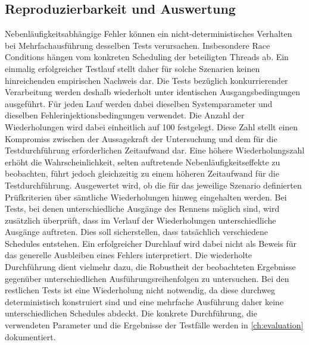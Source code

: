 \subsection{Reproduzierbarkeit und Auswertung}
\label{subsec:reproduzierbarkeit}
Nebenläufigkeitsabhängige Fehler können ein nicht-deterministisches Verhalten bei Mehrfachausführung desselben Tests verursachen.
Insbesondere Race Conditions hängen vom konkreten Scheduling der beteiligten Threads ab.
Ein einmalig erfolgreicher Testlauf stellt daher für solche Szenarien keinen hinreichenden empirischen Nachweis dar.
Die Tests bezüglich konkurrierender Verarbeitung werden deshalb wiederholt unter identischen Ausgangsbedingungen ausgeführt.
Für jeden Lauf werden dabei dieselben Systemparameter und dieselben Fehlerinjektionsbedingungen verwendet.
Die Anzahl der Wiederholungen wird dabei einheitlich auf 100 festgelegt.
Diese Zahl stellt einen Kompromiss zwischen der Aussagekraft der Untersuchung und dem für die Testdurchführung erforderlichen
Zeitaufwand dar.
Eine höhere Wiederholungszahl erhöht die Wahrscheinlichkeit, selten auftretende Nebenläufigkeitseffekte zu beobachten,
führt jedoch gleichzeitig zu einem höheren Zeitaufwand für die Testdurchführung.
Ausgewertet wird, ob die für das jeweilige Szenario definierten Prüfkriterien über sämtliche Wiederholungen hinweg eingehalten werden.
Bei Tests, bei denen unterschiedliche Ausgänge des Rennens möglich sind, wird zusätzlich überprüft, dass im Verlauf der Wiederholungen
unterschiedliche Ausgänge auftreten.
Dies soll sicherstellen, dass tatsächlich verschiedene Schedules entstehen.
Ein erfolgreicher Durchlauf wird dabei nicht als Beweis für das generelle Ausbleiben eines Fehlers interpretiert.
Die wiederholte Durchführung dient vielmehr dazu, die Robustheit der beobachteten Ergebnisse gegenüber unterschiedlichen
Ausführungsreihenfolgen zu untersuchen.
Bei den restlichen Tests ist eine Wiederholung nicht notwendig, da diese durchweg deterministisch konstruiert sind und
eine mehrfache Ausführung daher keine unterschiedlichen Schedules abdeckt.
Die konkrete Durchführung, die verwendeten Parameter und die Ergebnisse der Testfälle werden in \cref{ch:evaluation} dokumentiert.
